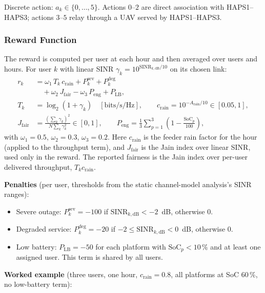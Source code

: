 \documentclass[conference]{IEEEtran}
\begin{document}
Discrete action: $a_k \in \{0,\dots,5\}$. Actions $0$--$2$ are direct association with HAPS1--HAPS3; actions $3$--$5$ relay through a UAV served by HAPS1--HAPS3.

\subsubsection{Reward Function}

The reward is computed per user at each hour and then averaged over users and hours. For user $k$ with linear SINR $\gamma_k = 10^{\text{SINR}_{k,\text{dB}}/10}$ on its chosen link:
\begin{align}
r_k &= \omega_1\,T_k\,c_\mathrm{rain} + P^\mathrm{sev}_k + P^\mathrm{deg}_k \\
&\quad + \omega_2\,J_\mathrm{fair} - \omega_3\,P_\mathrm{eng} + P_\mathrm{LB},\\
T_k &= \log_2(1+\gamma_k) \quad [\text{bits/s/Hz}], \qquad c_\mathrm{rain} = 10^{-A_\mathrm{rain}/10} \in [0.05,1],\\
J_\mathrm{fair} &= \frac{(\sum_k \gamma_k)^2}{N \sum_k \gamma_k^2} \in [0,1], \qquad
P_\mathrm{eng} = \frac{1}{3}\sum_{p=1}^{3} \left(1 - \frac{\text{SoC}_p}{100}\right),
\end{align}
with $\omega_1=0.5$, $\omega_2=0.3$, $\omega_3=0.2$. Here $c_\mathrm{rain}$ is the feeder rain factor for the hour (applied to the throughput term), and $J_\mathrm{fair}$ is the Jain index over linear SINR, used only in the reward. The reported fairness is the Jain index over per-user delivered throughput, $T_k c_\mathrm{rain}$.

\noindent \textbf{Penalties} (per user, thresholds from the static channel-model analysis's SINR ranges):
\begin{itemize}\setlength{\itemsep}{0pt}
  \item Severe outage: $P^\mathrm{sev}_k = -100$ if $\text{SINR}_{k,\text{dB}} < -2$~dB, otherwise $0$.
  \item Degraded service: $P^\mathrm{deg}_k = -20$ if $-2 \le \text{SINR}_{k,\text{dB}} < 0$~dB, otherwise $0$.
  \item Low battery: $P_\mathrm{LB} = -50$ for each platform with $\text{SoC}_p < 10\,\%$ and at least one assigned user. This term is shared by all users.
\end{itemize}

\noindent \textbf{Worked example} (three users, one hour, $c_\mathrm{rain}=0.8$, all platforms at SoC 60\,\%, no low-battery term):
\end{document}
